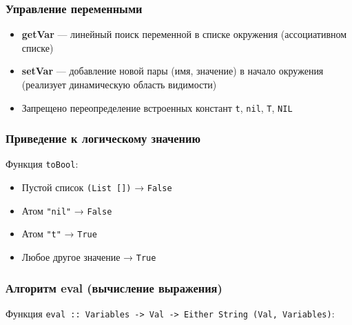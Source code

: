 \documentclass[a4paper,12pt]{article}
\begin{document}
\subsubsection{Управление переменными}
\begin{itemize}
    \item \textbf{getVar} — линейный поиск переменной в списке окружения (ассоциативном списке)
    \item \textbf{setVar} — добавление новой пары (имя, значение) в начало окружения (реализует динамическую область видимости)
    \item Запрещено переопределение встроенных констант \texttt{t}, \texttt{nil}, \texttt{T}, \texttt{NIL}
\end{itemize}

\subsubsection{Приведение к логическому значению}
Функция \texttt{toBool}:
\begin{itemize}
    \item Пустой список \texttt{(List [])} → \texttt{False}
    \item Атом \texttt{"nil"} → \texttt{False}
    \item Атом \texttt{"t"} → \texttt{True}
    \item Любое другое значение → \texttt{True}
\end{itemize}

\subsubsection{Алгоритм eval (вычисление выражения)}
Функция \texttt{eval :: Variables -> Val -> Either String (Val, Variables)}:
\end{document}
